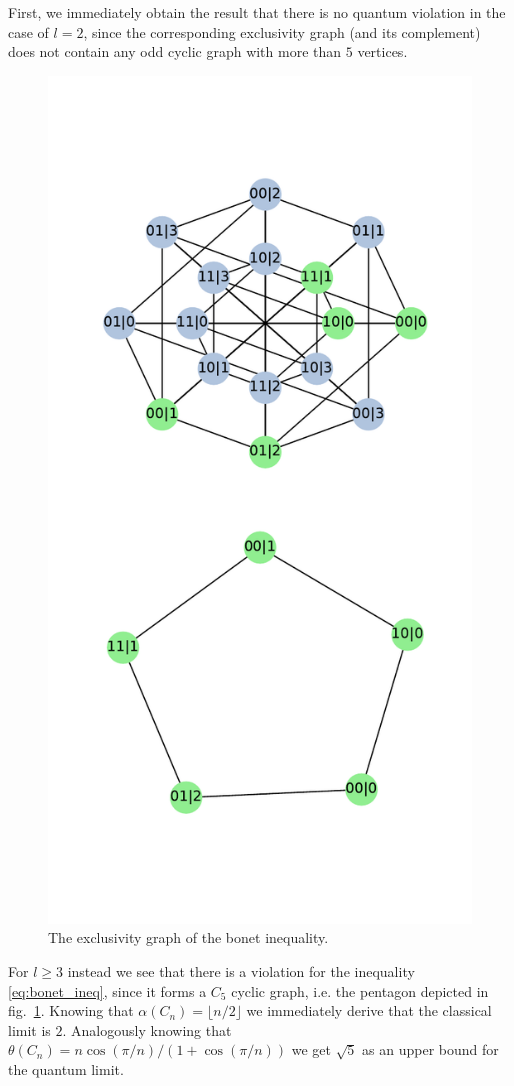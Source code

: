 \documentclass[
    nofootinbin,
    floatfix,
    amsfonts,
    twocolumn, 
    aps, 
    prl]{revtex4-1}
\begin{document}
First, we immediately obtain the result that there is no quantum violation in
the case of $l=2$, since the corresponding exclusivity graph (and its
complement) does not contain any odd cyclic graph with more than $5$ vertices.  

\begin{figure}[h]
    \centering
    \includegraphics[width=.8\columnwidth]{images/instrumental_c5.pdf}
    \caption{The exclusivity graph of the bonet inequality.}
    \label{fig:bonetexc}
\end{figure}

For $l\ge3$ instead we see that there is a violation for the inequality \eqref{eq:bonet_ineq},
since it forms a $C_5$ cyclic graph, i.e. the pentagon depicted in
fig.~\ref{fig:bonetexc}.
Knowing that $\alpha(C_n) = \lfloor n/2 \rfloor$ we immediately derive that the classical limit is $2$.
Analogously knowing that $\theta(C_n) = n\cos(\pi/n)/(1+\cos(\pi/n))$ we get
$\sqrt{5}$ as an upper bound for the quantum limit.
\end{document}
